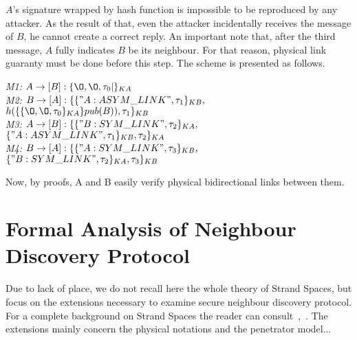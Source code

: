 $A$'s signature wrapped by hash function is impossible to be reproduced by any attacker. As the result of that, even the attacker incidentally receives the message of $B$, he cannot create a correct reply. An important note that, after the third message, $A$ fully indicates $B$ be its neighbour. For that reason, physical link guaranty must be done before this step. The scheme is presented as follows. 

\begin{flushleft}
 \emph{M1:} $A \to [B]: \{\O, \O, \tau_0|\}_{KA}$\\
 \emph{M2:} $B \to [A]: \{\{"A:ASYM\_LINK", \tau_1\}_{KB},$ $h(\{\{\O, \O, \tau_0\}_{KA}\}pub(B)),\tau_1\}_{KB}$\\
\emph{M3:} $A \to [B]: \{\{ "B:SYM\_LINK",\tau_2\}_{KA},$ $\{"A:ASYM\_LINK", \tau_1\}_{KB},\tau_2\}_{KA}$\\
 \emph{M4:} $B \to [A] : \{\{ "A:SYM\_LINK", \tau_3\}_{KB},$ $\{"B:SYM\_LINK",\tau_2\}_{KA} ,\tau_3\}_{KB}$
\end{flushleft}

Now, by proofs, A and B easily verify physical bidirectional links between them. 

\section{Formal Analysis of Neighbour Discovery Protocol}



Due to lack of place, we do not recall here the whole theory of Strand Spaces, but focus on the extensions necessary to examine secure neighbour discovery protocol. For a complete background on Strand Spaces the reader can consult~\cite{674832},~\cite{Guttman:2002:ATS:568264.568267}. The extensions mainly concern the physical notations and the penetrator model...
 
